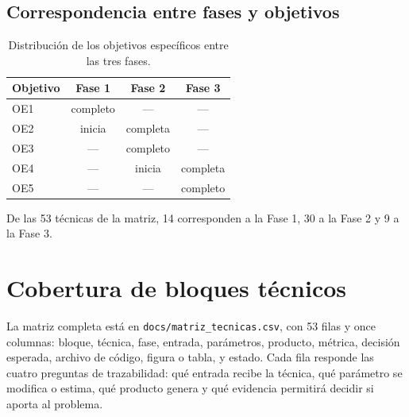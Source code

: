 \documentclass[12pt,a4paper]{article}
\begin{document}
\subsection{Correspondencia entre fases y objetivos}

\begin{table}[H]
\centering
\caption{Distribución de los objetivos específicos entre las tres fases.}
\small
\begin{tabular}{@{}lccc@{}}
\toprule
\textbf{Objetivo} & \textbf{Fase 1} & \textbf{Fase 2} & \textbf{Fase 3} \\
\midrule
OE1 & completo & --- & --- \\
OE2 & inicia & completa & --- \\
OE3 & --- & completo & --- \\
OE4 & --- & inicia & completa \\
OE5 & --- & --- & completo \\
\bottomrule
\end{tabular}
\end{table}

De las 53 técnicas de la matriz, 14 corresponden a la Fase 1, 30 a la Fase 2 y 9 a
la Fase 3.

\section{Cobertura de bloques técnicos}

La matriz completa está en \texttt{docs/matriz\_tecnicas.csv}, con 53 filas y
once columnas: bloque, técnica, fase, entrada, parámetros, producto, métrica,
decisión esperada, archivo de código, figura o tabla, y estado. Cada fila
responde las cuatro preguntas de trazabilidad: qué entrada recibe la técnica, qué
parámetro se modifica o estima, qué producto genera y qué evidencia permitirá
decidir si aporta al problema.
\end{document}
